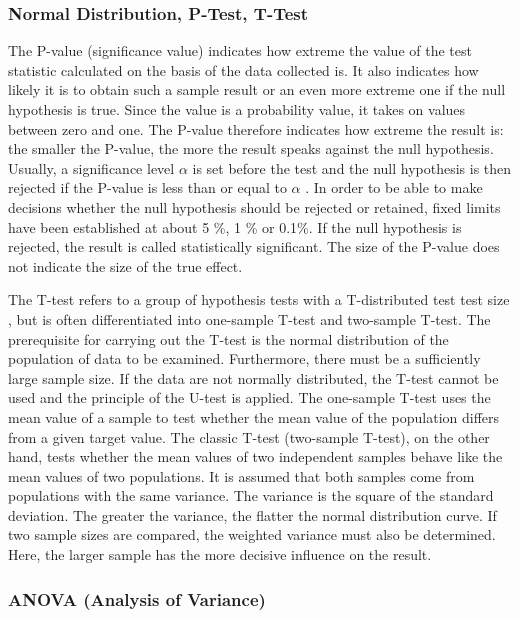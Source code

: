 \subsubsection{Normal Distribution, P-Test, T-Test}

The P-value (significance value) indicates how extreme the value of the test statistic calculated on the basis of the data collected is. It also indicates how likely it is to obtain such a sample result or an even more extreme one if the null hypothesis is true. Since the value is a probability value, it takes on values between zero and one. The P-value therefore indicates how extreme the result is: the smaller the P-value, the more the result speaks against the null hypothesis. Usually, a significance level $\alpha$ is set before the test and the null hypothesis is then rejected if the P-value is less than or equal to $\alpha$ \cite{Akremi:2011}. In order to be able to make decisions whether the null hypothesis should be rejected or retained, fixed limits have been established at about 5 \%, 1 \% or 0.1\%. If the null hypothesis is rejected, the result is called statistically significant. The size of the P-value does not indicate the size of the true effect.

The T-test refers to a group of hypothesis tests with a T-distributed test test size \cite{Akremi:2011}, but is often differentiated into one-sample T-test and two-sample T-test. The prerequisite for carrying out the T-test is the normal distribution of the population of data to be examined. Furthermore, there must be a sufficiently large sample size. If the data are not normally distributed, the T-test cannot be used and the principle of the U-test is applied. The one-sample T-test uses the mean value of a sample to test whether the mean value of the population differs from a given target value. The classic T-test (two-sample T-test), on the other hand, tests whether the mean values of two independent samples behave like the mean values of two populations. It is assumed that both samples come from populations with the same variance. The variance is the square of the standard deviation. The greater the variance, the flatter the normal distribution curve. If two sample sizes are compared, the weighted variance must also be determined. Here, the larger sample has the more decisive influence on the result.

\subsubsection{ANOVA (Analysis of Variance)}

